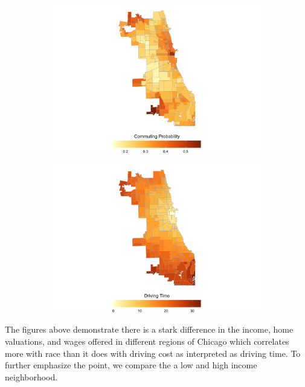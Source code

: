 \documentclass[12pt]{article}
\begin{document}
\begin{figure}[h!]
\centering
    \caption{Commuting Probability and Driving Time}
    \begin{subfigure}{0.49\textwidth}
         \centering
         \includegraphics[width=\textwidth]{Pset1/code/lodes_diagnostics_files/figure-html/unnamed-chunk-7-1.png}
    \end{subfigure}  
    \begin{subfigure}{0.49\textwidth}
         \centering
         \includegraphics[width=\linewidth]{Pset1/code/lodes_diagnostics_files/figure-html/unnamed-chunk-9-1.png}
    \end{subfigure}
    \label{fig:commute_time}
\end{figure}
The figures above demonstrate there is a stark difference in the income, home valuations, and wages offered in different regions of Chicago which correlates more with race than it does with driving cost as interpreted as driving time. To further emphasize the point, we compare the a low and high income neighborhood.  
\end{document}
